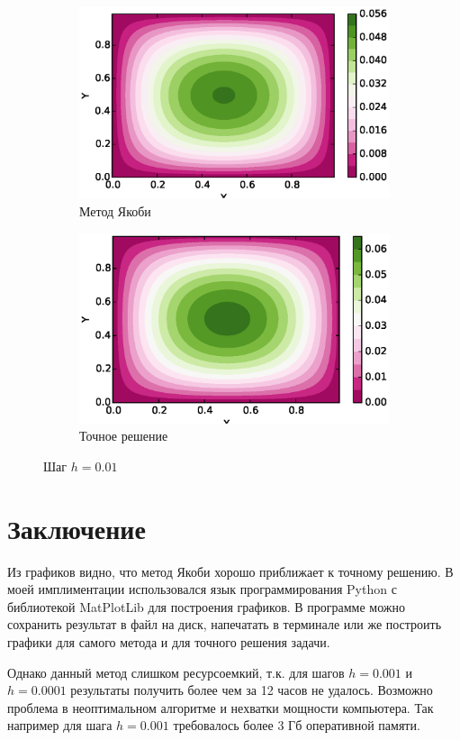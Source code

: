 \documentclass[12pt,a4paper]{article}
\begin{document}
\begin{figure}
	\centering
	\begin{subfigure}{\textwidth}
		\includegraphics{01_u.eps}
		\caption{Метод Якоби}\label{fig:u0.01}
	\end{subfigure}
	\begin{subfigure}{\textwidth}
		\includegraphics{01_exact.eps}
		\caption{Точное решение}\label{fig:e0.01}
	\end{subfigure}
	\caption{Шаг $h=0.01$}\label{fig:e0.01}
\end{figure}

\section{Заключение}
\label{sec:summary}

Из графиков видно, что метод Якоби хорошо приближает к точному решению. В моей имплиментации использовался язык программирования Python с библиотекой MatPlotLib для построения графиков. В программе можно сохранить результат в файл на диск, напечатать в терминале или же построить графики для самого метода и для точного решения задачи. \par
Однако данный метод слишком ресурсоемкий, т.к. для шагов $h=0.001$ и $h=0.0001$ результаты получить более чем за 12 часов не удалось. Возможно проблема в неоптимальном алгоритме и нехватки мощности компьютера. Так например для шага $h=0.001$ требовалось более 3 Гб оперативной памяти.
\end{document}
